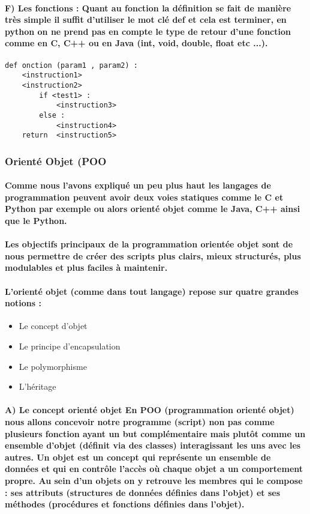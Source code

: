\documentclass[a4paper, 12pt, twoside]{article}
\begin{document}
\paragraph{F) Les fonctions : \newline
Quant au fonction la définition se fait de manière très simple il suffit d'utiliser le mot clé def et cela est terminer, en python on ne prend pas en compte le type de retour d'une fonction comme en C, C++ ou en Java (int, void, double, float etc ...).}
\begin{verbatim}
def onction (param1 , param2) :
    <instruction1>
    <instruction2>
        if <test1> :
            <instruction3>
        else :
            <instruction4>
    return  <instruction5>
\end{verbatim}
\subsubsection{Orienté Objet (POO}
\paragraph{ Comme nous l'avons expliqué un peu plus haut les langages de programmation peuvent avoir deux voies statiques comme le C et Python 
par exemple  ou alors orienté objet comme le Java, C++ ainsi que le Python.}
\paragraph{Les objectifs principaux de la programmation orientée objet sont de nous permettre de créer des scripts plus clairs, mieux structurés, plus modulables et plus faciles à maintenir.}
\paragraph{L'orienté objet (comme dans tout langage) repose sur quatre grandes notions :}
\begin{itemize}
\item Le concept d'objet
\item Le principe d'encapsulation 
\item Le polymorphisme
\item L'héritage
\end{itemize}

\paragraph{A) Le concept orienté objet \newline
En POO (programmation orienté objet) nous allons concevoir notre programme (script) non pas comme plusieurs fonction ayant un but complémentaire mais plutôt comme un ensemble d'objet (définit via des classes) interagissant les uns avec les autres. Un objet est un concept qui représente un ensemble de données et qui en contrôle l'accès où chaque objet a un comportement propre. Au sein d'un objets on y retrouve  les membres qui le compose : ses attributs (structures de données définies dans l'objet) et ses méthodes (procédures et fonctions définies dans l'objet).}
\end{document}
